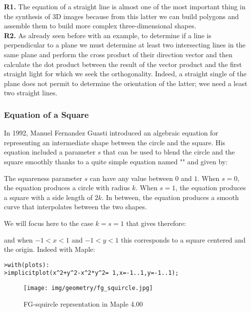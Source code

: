 	\begin{tcolorbox}[title=Remarks,colframe=black,arc=10pt]
	\textbf{R1.} The equation of a straight line is almost one of the most important thing in the synthesis of 3D images because from this latter we can build polygons and assemble them to build more complex three-dimensional shapes.\\
	
	\textbf{R2.} As already seen before with an example, to determine if a line is perpendicular to a plane we must determine at least two intersecting lines in the same plane and perform the cross product of their direction vector and then calculate the dot product between the result of the vector product and the first straight light for which we seek the orthogonality. Indeed, a straight single of the plane does not permit to determine the orientation of the latter; wee need a least two straight lines.
	\end{tcolorbox}
	
	\subsubsection{Equation of a Square}
	In 1992, Manuel Fernandez Guasti introduced an algebraic equation for representing an intermediate shape between the circle and the square. His equation included a parameter $s$ that can be used to blend the circle and the square smoothly thanks to a quite simple equation named "\label{fg squircle}" and given by:
	
	The squareness parameter $s$ can have any value between $0$ and $1$. When $s = 0$, the equation produces a circle with radius $k$. When $s = 1$, the equation produces a square with a side length of $2k$. In between, the equation produces a smooth curve that interpolates between the two shapes.
	
	We will focus here to the case $k=s=1$ that gives therefore:
	
	and when $-1<x<1$ and $-1<y<1$ this corresponds to a square centered and the origin. Indeed with Maple:
	
	\texttt{>with(plots):\\
	>implicitplot(x\string^2+y\string^2-x\string^2*y\string^2= 1,x=-1..1,y=-1..1);
	}
	\begin{figure}[H]
		\centering
		\texttt{[image: img/geometry/fg\_squircle.jpg]}
		\caption{FG-squircle reprsentation in Maple 4.00}
	\end{figure}

